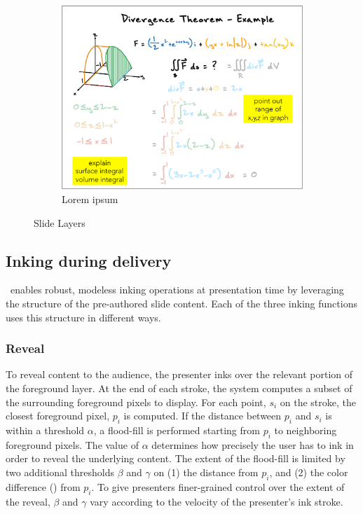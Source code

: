 \begin{figure}[ht!]
\begin{subfigure}[t]{0.32\textwidth}
        \includegraphics[width=1\columnwidth]{figures/videoslide3}
        \caption{Lorem ipsum}
    \end{subfigure}
    \caption{Slide Layers}
\end{figure}

\subsection{Inking during delivery}
%

\interface\ enables robust, modeless inking operations at presentation time by leveraging the structure of the pre-authored slide content. Each of the three inking functions uses this structure in different ways. 

\subsubsection{Reveal}
To reveal content to the audience, the presenter inks over the relevant portion of the foreground layer.
%
At the end of each stroke, the system computes a subset of the surrounding foreground pixels to display. 
%
For each point, $s_i$ on the stroke, the closest foreground pixel, $p_i$ is computed. If the distance between $p_i$ and $s_i$ is within a threshold $\alpha$, a flood-fill is performed starting from $p_i$ to neighboring foreground pixels. The value of $\alpha$ determines how precisely the user has to ink in order to reveal the underlying content. 
%
The extent of the flood-fill is limited by two additional thresholds $\beta$ and $\gamma$ on (1) the distance from $p_i$, and (2) the color difference () from $p_i$. 
%
To give presenters finer-grained control over the extent of the reveal, $\beta$ and $\gamma$ vary according to the velocity of the presenter's ink stroke.  

